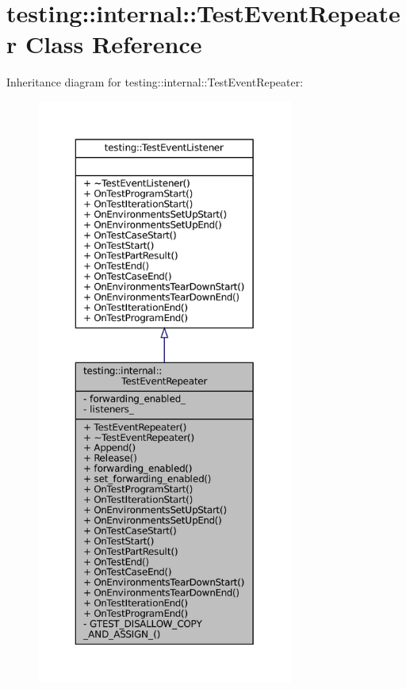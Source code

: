 \hypertarget{classtesting_1_1internal_1_1TestEventRepeater}{}\section{testing\+:\+:internal\+:\+:Test\+Event\+Repeater Class Reference}
\label{classtesting_1_1internal_1_1TestEventRepeater}


Inheritance diagram for testing\+:\+:internal\+:\+:Test\+Event\+Repeater\+:
\nopagebreak
\begin{figure}[H]
\begin{center}
\leavevmode
\includegraphics[height=550pt]{classtesting_1_1internal_1_1TestEventRepeater__inherit__graph}
\end{center}
\end{figure}


